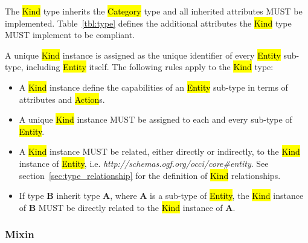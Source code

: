 \documentclass[10pt,a4paper,british]{article}
\begin{document}
The \hl{Kind} type inherits the \hl{Category} type and all inherited
attributes MUST be implemented. Table~\ref{tbl:type} defines the
additional attributes the \hl{Kind} type MUST implement to be compliant.

A unique \hl{Kind} instance is assigned as the unique identifier of every
\hl{Entity} sub-type, including \hl{Entity} itself. The following rules apply
to the \hl{Kind} type:
\begin{itemize}
\item A \hl{Kind} instance define the capabilities of an \hl{Entity} sub-type
 in terms of attributes and \hl{Action}s.
\item A unique \hl{Kind} instance MUST be assigned to each and every sub-type
 of \hl{Entity}.
\item A \hl{Kind} instance MUST be related, either directly or indirectly, to
 the \hl{Kind} instance of \hl{Entity},
 i.e. \textit{http://schemas.ogf.org/occi/core\#entity}.
 See section~\ref{sec:type_relationship} for the definition of \hl{Kind}
 relationships.
\item If type {\bf B} inherit type {\bf A}, where {\bf A} is a sub-type of
 \hl{Entity}, the \hl{Kind} instance of {\bf B} MUST be directly related to the
 \hl{Kind} instance of {\bf A}.
\end{itemize}

\subsubsection{Mixin}
\end{document}
